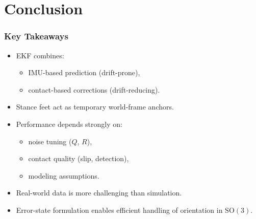 \documentclass[aspectratio=169]{beamer}
\begin{document}
\section{Conclusion}
\begin{frame}
	\frametitle{Key Takeaways}
	
	\begin{itemize}
		\item EKF combines:
		\begin{itemize}
			\item IMU-based prediction (drift-prone),
			\item contact-based corrections (drift-reducing).
		\end{itemize}
		
		\item Stance feet act as temporary world-frame anchors.
		
		\item Performance depends strongly on:
		\begin{itemize}
			\item noise tuning ($Q$, $R$),
			\item contact quality (slip, detection),
			\item modeling assumptions.
		\end{itemize}
		
		\item Real-world data is more challenging than simulation.
		
		\item Error-state formulation enables efficient handling of orientation in $\mathrm{SO}(3)$.
	\end{itemize}
	
\end{frame}
\end{document}
